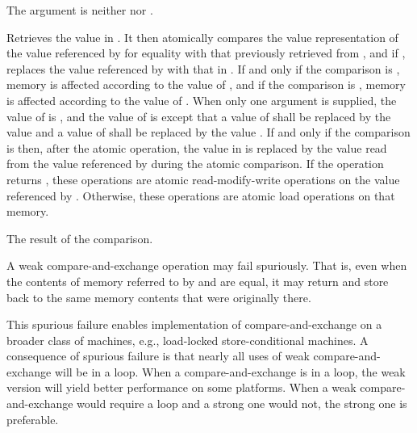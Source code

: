 \begin{itemdescr}
\pnum
\expects
The  argument is neither
 nor .

\pnum
\effects
Retrieves the value in .
It then atomically compares the value representation of
the value referenced by  for equality
with that previously retrieved from ,
and if , replaces the value referenced by 
with that in .
If and only if the comparison is ,
memory is affected according to the value of , and
if the comparison is ,
memory is affected according to the value of .
When only one  argument is supplied,
the value of  is , and
the value of  is 
except that a value of  shall be replaced by
the value  and
a value of  shall be replaced by
the value .
If and only if the comparison is  then,
after the atomic operation,
the value in  is replaced by
the value read from the value referenced by 
during the atomic comparison.
If the operation returns ,
these operations are atomic read-modify-write operations
on the value referenced by .
Otherwise, these operations are atomic load operations on that memory.

\pnum
\returns
The result of the comparison.

\pnum
\remarks
A weak compare-and-exchange operation may fail spuriously.
That is, even when the contents of memory referred to
by  and  are equal,
it may return  and
store back to  the same memory contents
that were originally there.
\begin{note}
This spurious failure enables implementation of compare-and-exchange
on a broader class of machines, e.g., load-locked store-conditional machines.
A consequence of spurious failure is
that nearly all uses of weak compare-and-exchange will be in a loop.
When a compare-and-exchange is in a loop,
the weak version will yield better performance on some platforms.
When a weak compare-and-exchange would require a loop and
a strong one would not, the strong one is preferable.
\end{note}
\end{itemdescr}

